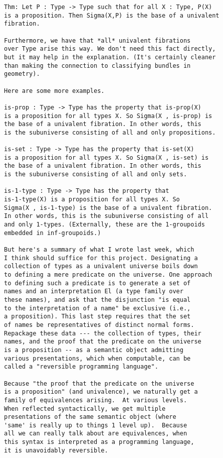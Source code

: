 \documentclass{entcs}
\begin{document}
\begin{verbatim}
Thm: Let P : Type -> Type such that for all X : Type, P(X)
is a proposition. Then Sigma(X,P) is the base of a univalent
fibration.

Furthermore, we have that *all* univalent fibrations
over Type arise this way. We don't need this fact directly,
but it may help in the explanation. (It's certainly cleaner
than making the connection to classifying bundles in
geometry).

Here are some more examples.

is-prop : Type -> Type has the property that is-prop(X)
is a proposition for all types X. So Sigma(X , is-prop) is
the base of a univalent fibration. In other words, this
is the subuniverse consisting of all and only propositions.

is-set : Type -> Type has the property that is-set(X)
is a proposition for all types X. So Sigma(X , is-set) is
the base of a univalent fibration. In other words, this
is the subuniverse consisting of all and only sets.

is-1-type : Type -> Type has the property that
is-1-type(X) is a proposition for all types X. So
Sigma(X , is-1-type) is the base of a univalent fibration.
In other words, this is the subuniverse consisting of all
and only 1-types. (Externally, these are the 1-groupoids
embedded in inf-groupoids.)

But here's a summary of what I wrote last week, which
I think should suffice for this project. Designating a
collection of types as a univalent universe boils down
to defining a mere predicate on the universe. One approach
to defining such a predicate is to generate a set of
names and an interpretation El (a type family over
these names), and ask that the disjunction "is equal
to the interpretation of a name" be exclusive (i.e.,
a proposition). This last step requires that the set
of names be representatives of distinct normal forms.
Repackage these data --- the collection of types, their
names, and the proof that the predicate on the universe
is a proposition -- as a semantic object admitting
various presentations, which when computable, can be
called a "reversible programming language".

Because "the proof that the predicate on the universe
is a proposition" (and univalence), we naturally get a
family of equivalences arising.  At various levels.
When reflected syntactically, we get multiple
presentations of the same semantic object (where
'same' is really up to things 1 level up).  Because
all we can really talk about are equivalences, when
this syntax is interpreted as a programming language,
it is unavoidably reversible.


\end{verbatim}
\end{document}
